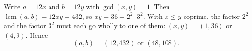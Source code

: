 Write $a=12x$ and $b=12y$ with $\gcd(x,y)=1$. Then $\operatorname{lcm}(a,b)=12xy=432$, so $xy=36=2^2\cdot3^2$. With $x\le y$ coprime, the factor $2^2$ and the factor $3^2$ must each go wholly to one of them: $(x,y)=(1,36)$ or $(4,9)$. Hence
\[(a,b)=\boxed{(12,432)\text{ or }(48,108)}.\]
